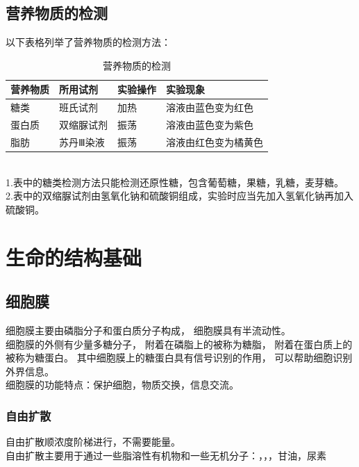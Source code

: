 \documentclass[UTF8]{ctexart}
\begin{document}
\subsection{营养物质的检测}
    以下表格列举了营养物质的检测方法：\vspace{5pt}
    \begin{table}[h]
        \begin{center}
            \begin{tabular}{l|l|l|l}
                \hline
                营养物质\qquad\qquad&所用试剂\qquad\qquad\qquad&实验操作\qquad\qquad&实验现象\qquad\qquad\\ \hline
                糖类&班氏试剂&加热&溶液由蓝色变为红色\\ \hline
                蛋白质&双缩脲试剂&振荡&溶液由蓝色变为紫色\\ \hline
                脂肪&苏丹Ⅲ染液&振荡&溶液由红色变为橘黄色\\ \hline
            \end{tabular}
            \caption{营养物质的检测}
        \end{center}
    \end{table}\\
    1.表中的糖类检测方法只能检测还原性糖，包含葡萄糖，果糖，乳糖，麦芽糖。\\[3mm]
    2.表中的双缩脲试剂由氢氧化钠和硫酸铜组成，实验时应当先加入氢氧化钠再加入硫酸铜。

\section{生命的结构基础}

\subsection{细胞膜}
    细胞膜主要由磷脂分子和蛋白质分子构成，
    细胞膜具有半流动性。\\[3mm]
    细胞膜的外侧有少量多糖分子，
    附着在磷脂上的被称为糖脂，
    附着在蛋白质上的被称为糖蛋白。
    其中细胞膜上的糖蛋白具有信号识别的作用，
    可以帮助细胞识别外界信息。\\[3mm]
    细胞膜的功能特点：保护细胞，物质交换，信息交流。

\subsubsection{自由扩散}
    自由扩散顺浓度阶梯进行，不需要能量。\\[3mm]
    自由扩散主要用于通过一些脂溶性有机物和一些无机分子：，，，甘油，尿素
\end{document}
